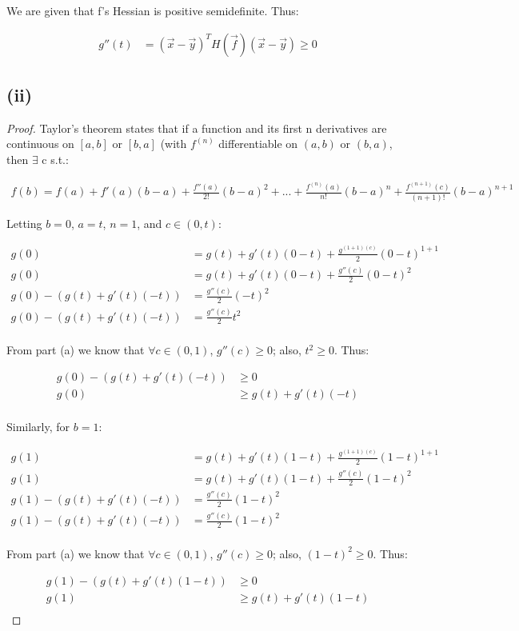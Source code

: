 \documentclass[twoside,11pt]{homework}
\begin{document}
We are given that f's Hessian is positive semidefinite. Thus:

\begin{align*}
	g''(t) &=(\vec{x}-\vec{y})^TH(\vec{f})(\vec{x}-\vec{y}) \geq 0
\end{align*}


\subsection{(ii)}
\begin{proof}
Taylor's theorem states that if a function and its first n derivatives are continuous on $[a, b]$ or $[b, a]$ (with $f^{(n)}$ differentiable on $(a, b)$ or $(b, a)$, then $\exists$ c s.t.:

\begin{align*}
	f(b) = f(a)+f'(a)(b-a)+\frac{f''(a)}{2!}(b-a)^2 +...+\frac{f^{(n)}(a)}{n!}(b-a)^n+\frac{f^{(n+1)}(c)}{(n+1)!}(b-a)^{n+1}
\end{align*}

Letting $b = 0$, $a = t$, $n=1$, and $c \in (0, t)$:

\begin{align*}
	g(0) &= g(t) + g'(t)(0-t)+\frac{g^{(1+1)(c)}}{2}(0-t)^{1+1}\\
	g(0)&= g(t) + g'(t)(0-t)+\frac{g''(c)}{2}(0-t)^{2}\\
	g(0)-(g(t) + g'(t)(-t)) &= \frac{g''(c)}{2}(-t)^{2}\\
	g(0)-(g(t) + g'(t)(-t)) &= \frac{g''(c)}{2}t^{2}\\
\end{align*}

From part (a) we know that $\forall c \in (0, 1)$, $g''(c) \geq 0$; also, $t^2 \geq 0$. Thus:

\begin{align*}
	g(0)-(g(t) + g'(t)(-t)) &\geq 0\\
	g(0)&\geq g(t) + g'(t)(-t)\\
\end{align*}

Similarly, for $b = 1$:

\begin{align*}
	g(1) &= g(t) + g'(t)(1-t)+\frac{g^{(1+1)(c)}}{2}(1-t)^{1+1}\\
	g(1)&= g(t) + g'(t)(1-t)+\frac{g''(c)}{2}(1-t)^{2}\\
	g(1)-(g(t) + g'(t)(-t)) &= \frac{g''(c)}{2}(1-t)^{2}\\
	g(1)-(g(t) + g'(t)(-t)) &= \frac{g''(c)}{2}(1-t)^{2}\\
\end{align*}

From part (a) we know that $\forall c \in (0, 1)$, $g''(c) \geq 0$; also, $(1-t)^2 \geq 0$. Thus:

\begin{align*}
	g(1)-(g(t) + g'(t)(1-t)) &\geq 0\\
	g(1)&\geq g(t) + g'(t)(1-t)\\
\end{align*}
\end{proof}
\end{document}
